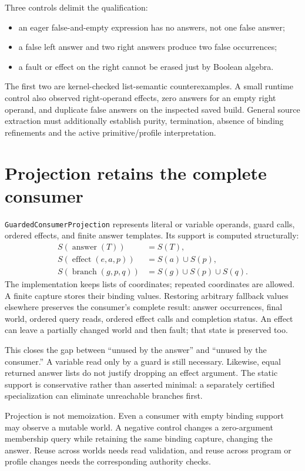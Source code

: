 \documentclass[11pt,a4paper]{article}
\newcommand{\code}[1]{\nolinkurl{#1}}
\begin{document}
Three controls delimit the qualification:
\begin{itemize}
\item an eager false-and-empty expression has no answers, not one false answer;
\item a false left answer and two right answers produce two false occurrences;
\item a fault or effect on the right cannot be erased just by Boolean algebra.
\end{itemize}
The first two are kernel-checked list-semantic counterexamples. A small runtime
control also observed right-operand effects, zero answers for an empty right
operand, and duplicate false answers on the inspected saved build. General
source extraction must additionally establish purity, termination, absence of
binding refinements and the active primitive/profile interpretation.

\section{Projection retains the complete consumer}

\code{GuardedConsumerProjection} represents literal or variable operands,
guard calls, ordered effects, and finite answer templates. Its support is
computed structurally:
\[
 \begin{split}
 S(\operatorname{answer}(T)) &= S(T),\\
 S(\operatorname{effect}(e,a,p)) &= S(a)\cup S(p),\\
 S(\operatorname{branch}(g,p,q)) &= S(g)\cup S(p)\cup S(q).
 \end{split}
\]
The implementation keeps lists of coordinates; repeated coordinates are
allowed. A finite capture stores their binding values. Restoring arbitrary
fallback values elsewhere preserves the consumer's complete result:
answer occurrences, final world, ordered query reads, ordered effect calls
and completion status. An effect can leave a partially changed world and
then fault; that state is preserved too.

This closes the gap between ``unused by the answer'' and ``unused by the
consumer.'' A variable read only by a guard is still necessary. Likewise,
equal returned answer lists do not justify dropping an effect argument.
The static support is conservative rather than asserted minimal: a separately
certified specialization can eliminate unreachable branches first.

Projection is not memoization. Even a consumer with empty binding support
may observe a mutable world. A negative control changes a zero-argument
membership query while retaining the same binding capture, changing the
answer. Reuse across worlds needs read validation, and reuse across program
or profile changes needs the corresponding authority checks.
\end{document}
